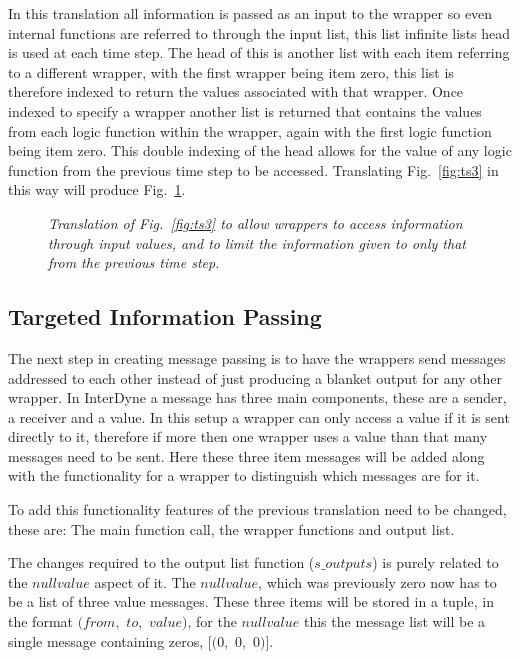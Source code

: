 \documentclass{article}
\begin{document}
In this translation all information is passed as an input to the wrapper so even internal functions are referred to through the input list, this list infinite lists head is used at each time step. The head of this is another list with each item referring to a different wrapper, with the first wrapper being item zero, this list is therefore indexed to return the values associated with that wrapper. Once indexed to specify a wrapper another list is returned that contains the values from each logic function within the wrapper, again with the first logic function being item zero. This double indexing of the head allows for the value of any logic function from the previous time step to be accessed. Translating Fig.~\ref{fig:ts3} in this way will produce Fig.~\ref{fig:ts4}.
\begin{figure}[H]
	\centering
	
	\caption{\it Translation of Fig.~\ref{fig:ts3} to allow wrappers to access information through input values, and to limit the information given to only that from the previous time step.}
	\label{fig:ts4}
\end{figure} 

\subsection{Targeted Information Passing}
The next step in creating message passing is to have the wrappers send messages addressed to each other instead of just producing a blanket output for any other wrapper. In InterDyne a message has three main components, these are a sender, a receiver and a value. In this setup a wrapper can only access a value if it is sent directly to it, therefore if more then one wrapper uses a value than that many messages need to be sent. Here these three item messages will be added along with the functionality for a wrapper to distinguish which messages are for it. 

To add this functionality features of the previous translation need to be changed, these are: The main function call, the wrapper functions and output list. 

The changes required to the output list function ($s\_outputs$) is purely related to the $nullvalue$ aspect of it. The $nullvalue$, which was previously zero now has to be a list of three value messages. These three items will be stored in a tuple, in the format $(from,$ $to,$ $value)$, for the $nullvalue$ this the message list will be a single message containing zeros, $[(0,$ $0,$ $0)]$.  
\end{document}
